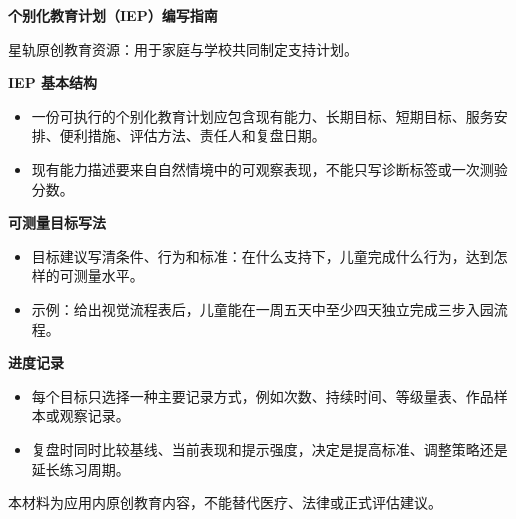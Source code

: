 \documentclass[11pt]{article}
\begin{document}
{\color[HTML]{1F5FD2}\LARGE\bfseries 个别化教育计划（IEP）编写指南\par}
{\color[HTML]{667085}\small 星轨原创教育资源：用于家庭与学校共同制定支持计划。\par}
\vspace{0.8em}
{\color[HTML]{111827}\large\bfseries IEP 基本结构\par}
\begin{itemize}
\item 一份可执行的个别化教育计划应包含现有能力、长期目标、短期目标、服务安排、便利措施、评估方法、责任人和复盘日期。
\item 现有能力描述要来自自然情境中的可观察表现，不能只写诊断标签或一次测验分数。
\end{itemize}
{\color[HTML]{111827}\large\bfseries 可测量目标写法\par}
\begin{itemize}
\item 目标建议写清条件、行为和标准：在什么支持下，儿童完成什么行为，达到怎样的可测量水平。
\item 示例：给出视觉流程表后，儿童能在一周五天中至少四天独立完成三步入园流程。
\end{itemize}
{\color[HTML]{111827}\large\bfseries 进度记录\par}
\begin{itemize}
\item 每个目标只选择一种主要记录方式，例如次数、持续时间、等级量表、作品样本或观察记录。
\item 复盘时同时比较基线、当前表现和提示强度，决定是提高标准、调整策略还是延长练习周期。
\end{itemize}
\vfill
{\color[HTML]{667085}\footnotesize 本材料为应用内原创教育内容，不能替代医疗、法律或正式评估建议。\par}
\end{document}
